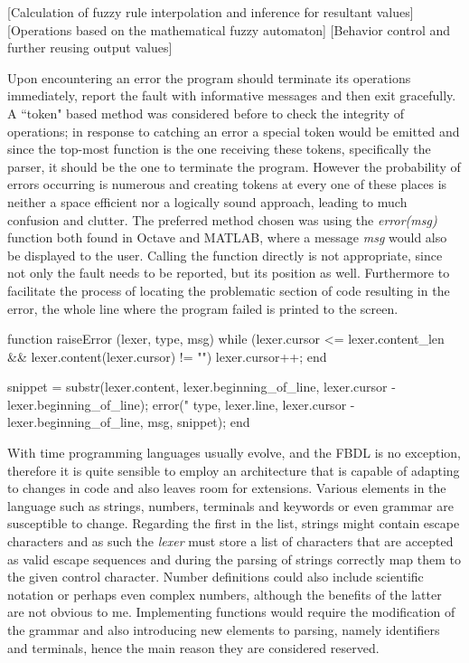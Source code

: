 [Calculation of fuzzy rule interpolation and inference for resultant values]
[Operations based on the mathematical fuzzy automaton]
[Behavior control and further reusing output values]

Upon encountering an error the program should terminate its operations immediately, report the fault with informative messages and then exit gracefully. A ``token" based method was considered before to check the integrity of operations; in response to catching an error a special token would be emitted and since the top-most function is the one receiving these tokens, specifically the parser, it should be the one to terminate the program. However the probability of errors occurring is numerous and creating tokens at every one of these places is neither a space efficient nor a logically sound approach, leading to much confusion and clutter. The preferred method chosen was using the \textit{error(msg)} function both found in Octave and MATLAB, where a message \textit{msg} would also be displayed to the user. Calling the function directly is not appropriate, since not only the fault needs to be reported, but its position as well. Furthermore to facilitate the process of locating the problematic section of code resulting in the error, the whole line where the program failed is printed to the screen.

\begin{octave}
function raiseError (lexer, type, msg)
  while (lexer.cursor <= lexer.content_len &&
       lexer.content(lexer.cursor) != "\n")
    lexer.cursor++;
  end

  snippet = substr(lexer.content,
  lexer.beginning_of_line, lexer.cursor - lexer.beginning_of_line);
  error("%
    type, lexer.line, lexer.cursor - lexer.beginning_of_line,
    msg, snippet);
end
\end{octave}


With time programming languages usually evolve, and the FBDL is no exception, therefore it is quite sensible to employ an architecture that is capable of adapting to changes in code and also leaves room for extensions. Various elements in the language such as strings, numbers, terminals and keywords or even grammar are susceptible to change. Regarding the first in the list, strings might contain escape characters and as such the \textit{lexer} must store a list of characters that are accepted as valid escape sequences and during the parsing of strings correctly map them to the given control character. Number definitions could also include scientific notation or perhaps even complex numbers, although the benefits of the latter are not obvious to me. Implementing functions would require the modification of the grammar and also introducing new elements to parsing, namely identifiers and terminals, hence the main reason they are considered reserved.

